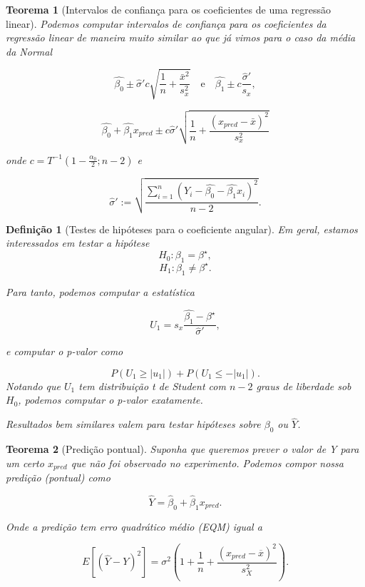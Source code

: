 \documentclass{article}
\newtheorem{theorem}{Teorema}
\newtheorem{definition}{Definição}
\begin{document}
	\begin{theorem}[Intervalos de confiança para os coeficientes de uma regressão linear]
		Podemos computar intervalos de confiança para os coeficientes da regressão linear
		de maneira muito similar ao que já vimos para o caso da média da Normal
		
		$$\hat{\beta_0} \pm \hat{\sigma}' c\sqrt{\frac{1}{n} + \frac{\bar{x}^2}{s_x^2}}\quad \mathrm{e}\quad \hat{\beta_1} \pm c\frac{\hat{\sigma}'}{s_x},$$
		
		$$\hat{\beta_0} + \hat{\beta_1}x_{pred} \pm c \hat{\sigma}' \sqrt{\frac{1}{n} + \frac{\left(x_{pred}-\bar{x}\right)^2}{s_x^2} }$$
		
		onde $c = T^{-1}(1-\frac{\alpha_0}{2}; n-2)$ e 
		
		$$\hat{\sigma}' := \sqrt{\frac{\sum_{i=1}^n \left(Y_i - \hat{\beta_0} - \hat{\beta_1}x_i \right)^2}{n-2}}.
		$$
	\end{theorem}
	
	\begin{definition}[Testes de hipóteses para o coeficiente angular]
		Em geral, estamos interessados em testar a hipótese
		$$H_0 : \beta_1 = \beta^\star,$$
		$$H_1 : \beta_1 \neq \beta^\star.$$
		
		Para tanto, podemos computar a estatística
		
		\begin{equation}
			U_1 = s_x \frac{\hat{\beta_1}-\beta^\star}{\hat{\sigma}'},
		\end{equation}
		
		e computar o p-valor como 
		
		\begin{equation}
			P(U_1 \geq |u_1|) + P(U_1 \leq -|u_1|).
		\end{equation}
		Notando que $U_1$ tem distribuição t de Student com $n-2$ graus de liberdade sob $H_0$, podemos computar o p-valor exatamente.
		
		Resultados bem similares valem para testar hipóteses sobre $\beta_0$ ou $\hat{Y}$.
	\end{definition}
	
	\begin{theorem}[Predição pontual]
		Suponha que queremos prever o valor de Y para um certo $x_{pred}$ que não foi observado no experimento. Podemos compor nossa predição (pontual) como
		
		\begin{equation}
			\hat{Y} = \hat{\beta}_0 + \hat{\beta}_1 x_{pred}.
		\end{equation}
		
		Onde a predição tem erro quadrático médio (EQM) igual a
		
		$$E \left [ (\hat{Y} - Y)^2 \right ] = \sigma^2 \left ( 1 + \frac{1}{n} + \frac{(x_{pred} - \overline{x})^2}{s_X^2} \right ).$$
	\end{theorem}
	
\end{document}
